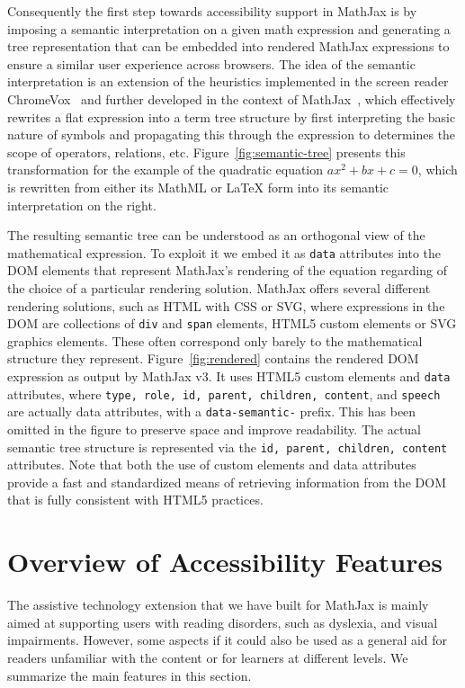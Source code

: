 \documentclass{sig-alternate}
\begin{document}
Consequently the first step towards accessibility support in MathJax is by
imposing a semantic interpretation on a given math expression and generating a
tree representation that can be embedded into rendered MathJax expressions to
ensure a similar user experience across browsers. The idea of the semantic
interpretation is an extension of the heuristics implemented in the screen
reader ChromeVox~\cite{Sorge14} and further developed in the context of
MathJax~\cite{cervone2016towards}, which effectively rewrites a flat expression
into a term tree structure by first interpreting the basic nature of symbols and
propagating this through the expression to determines the scope of operators,
relations, etc. Figure~\ref{fig:semantic-tree} presents this transformation for
the example of the quadratic equation $ax^2 + bx + c = 0$, which is rewritten
from either its MathML or {\LaTeX} form into its semantic interpretation on the
right.

The resulting semantic tree can be understood as an orthogonal view of the
mathematical expression. To exploit it we embed it as \texttt{data} attributes
into the DOM elements that represent MathJax's rendering of the equation
regarding of the choice of a particular rendering solution. MathJax offers
several different rendering solutions, such as HTML with CSS or SVG, where
expressions in the DOM are collections of \texttt{div} and \texttt{span}
elements, HTML5 custom elements or SVG graphics elements. These often correspond
only barely to the mathematical structure they represent.
Figure~\ref{fig:rendered} contains the rendered DOM expression as output by
MathJax v3. It uses HTML5 custom elements and \texttt{data} attributes, where
\texttt{type, role, id, parent, children, content}, and \texttt{speech} are
actually data attributes, with a \texttt{data-semantic-} prefix. This has been
omitted in the figure to preserve space and improve readability. The actual
semantic tree structure is represented via the \texttt{id, parent, children,
  content} attributes. Note that both the use of custom elements and data
attributes provide a fast and standardized means of retrieving information from
the DOM that is fully consistent with HTML5 practices.


\section{Overview of Accessibility Features}
\label{sec:at-solution}

The assistive technology extension that we have built for MathJax is mainly
aimed at supporting users with reading disorders, such as dyslexia, and visual
impairments. However, some aspects if it could also be used as a general aid for
readers unfamiliar with the content or for learners at different levels. We
summarize the main features in this section.
\end{document}
